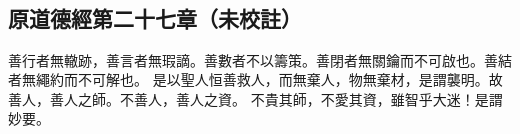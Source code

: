 ﻿%
%

\chapter{~}

\section{原道德經第二十七章（未校註）}

\begin{withgezhu}

\zhsong


\textcolor{tongjia-color}{善行者無轍跡，善言者無瑕謫。善數者不以籌策。善閉者無關鑰而不可啟也。善結者無繩約而不可解也。}
是以聖人恒善救人，而無棄人，物無棄材，是謂襲明。故善人，善人之師。不善人，善人之資。
不貴其師，不愛其資，\textcolor{tongjia-color}{雖智乎大迷！是謂妙要。}

\end{withgezhu}
